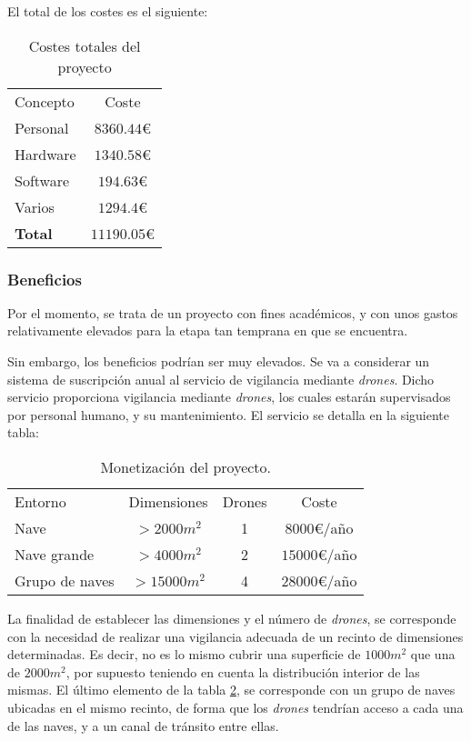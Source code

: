 El total de los costes es el siguiente: 
\begin{table}
	\begin{center}
		\begin{tabular}{l  c}\hline
			\toprule
			Concepto & Coste\\
			\otoprule
			Personal & $8360.44$\euro \\
			Hardware & $1340.58$\euro \\
			Software & $194.63$\euro\\
			Varios & $1294.4$\euro\\
			\hline
			\textbf{Total} & $11190.05 $\euro\\
			\bottomrule
		\end{tabular}
		\caption{Costes totales del proyecto}
		\label{tb:costesTotales}
	\end{center}
\end{table}


\subsubsection{Beneficios}

Por el momento, se trata de un proyecto con fines académicos, y con unos gastos relativamente elevados para la etapa tan temprana en que se encuentra. 

Sin embargo, los beneficios podrían ser muy elevados. Se va a considerar un sistema de suscripción anual al servicio de vigilancia mediante \emph{drones}. Dicho servicio proporciona vigilancia mediante \emph{drones}, los cuales estarán supervisados por personal humano, y su mantenimiento. El servicio se detalla en la siguiente tabla: 
\begin{table}
\begin{center}
		\begin{tabular}{l  c  c  c}\hline
			\toprule
			Entorno & Dimensiones & Drones & Coste\\
			\otoprule
			Nave & $>2000 m^2$ &  1 & $8000$\euro/año\\
			Nave grande & $>4000 m^2$ & 2 & $15000 $\euro/año\\
			Grupo de naves & $>15000 m^2$ & 4 & $28000$\euro/año\\
			\bottomrule
		\end{tabular}
		\caption{Monetización del proyecto.}
		\label{tb:money}
		\end{center}
\end{table}

La finalidad de establecer las dimensiones y el número de \emph{drones}, se corresponde con la necesidad de realizar una vigilancia adecuada de un recinto de dimensiones determinadas. Es decir, no es lo mismo cubrir una superficie de $1000m^2$ que una de $2000m^2$, por supuesto teniendo en cuenta la distribución interior de las mismas. 
El último elemento de la tabla \ref{tb:money}, se corresponde con un grupo de naves ubicadas en el mismo recinto, de forma que los \emph{drones} tendrían acceso a cada una de las naves, y a un canal de tránsito entre ellas. 

